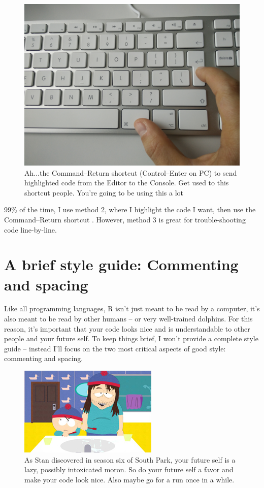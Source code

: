 \documentclass[]{book}
\theoremstyle{definition}
\theoremstyle{definition}
\theoremstyle{remark}
\begin{document}
\begin{figure}

{\centering \includegraphics[width=0.5\linewidth]{images/commandreturn} 

}

\caption{Ah...the Command--Return shortcut (Control--Enter on PC) to send highlighted code from the Editor to the Console. Get used to this shortcut people. You're going to be using this a lot}\label{fig:commandreturn}
\end{figure}

99\% of the time, I use method 2, where I highlight the code I want,
then use the Command--Return shortcut . However, method 3 is great for
trouble-shooting code line-by-line.

\section{A brief style guide: Commenting and
spacing}\label{a-brief-style-guide-commenting-and-spacing}

Like all programming languages, R isn't just meant to be read by a
computer, it's also meant to be read by other humans -- or very
well-trained dolphins. For this reason, it's important that your code
looks nice and is understandable to other people and your future self.
To keep things brief, I won't provide a complete style guide -- instead
I'll focus on the two most critical aspects of good style: commenting
and spacing.

\begin{figure}

{\centering \includegraphics[width=0.5\linewidth]{images/futureself} 

}

\caption{As Stan discovered in season six of South Park, your future self is a lazy, possibly intoxicated moron. So do your future self a favor and make your code look nice. Also maybe go for a run once in a while.}\label{fig:futureself}
\end{figure}
\end{document}
